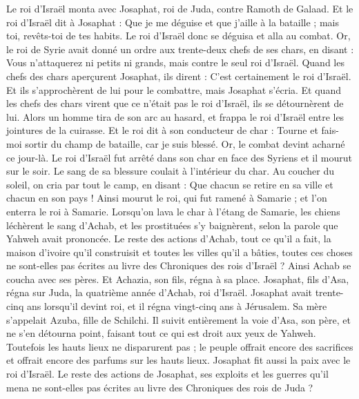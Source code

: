 \begin{multicols}{2}
Le roi d'Israël monta avec Josaphat, roi de Juda, contre Ramoth de Galaad.
Et le roi d'Israël dit à Josaphat : Que je me déguise et que j'aille à la bataille ; mais toi, revêts-toi de tes habits. Le roi d'Israël donc se déguisa et alla au combat.
Or, le roi de Syrie avait donné un ordre aux trente-deux chefs de ses chars, en disant : Vous n’attaquerez ni petits ni grands, mais contre le seul roi d'Israël.
Quand les chefs des chars aperçurent Josaphat, ils dirent : C'est certainement le roi d'Israël. Et ils s’approchèrent de lui pour le combattre, mais Josaphat s'écria.
Et quand les chefs des chars virent que ce n'était pas le roi d'Israël, ils se détournèrent de lui.
Alors un homme tira de son arc au hasard, et frappa le roi d'Israël entre les jointures de la cuirasse. Et le roi dit à son conducteur de char : Tourne et fais-moi sortir du champ de bataille, car je suis blessé.
Or, le combat devint acharné ce jour-là. Le roi d'Israël fut arrêté dans son char en face des Syriens et il mourut sur le soir. Le sang de sa blessure coulait à l’intérieur du char.
Au coucher du soleil, on cria par tout le camp, en disant : Que chacun se retire en sa ville et chacun en son pays !
Ainsi mourut le roi, qui fut ramené à Samarie ; et l’on enterra le roi à Samarie.
Lorsqu’on lava le char à l’étang de Samarie, les chiens léchèrent le sang d’Achab, et les prostituées s’y baignèrent, selon la parole que Yahweh avait prononcée.
Le reste des actions d'Achab, tout ce qu’il a fait, la maison d'ivoire qu'il construisit et toutes les villes qu'il a bâties, toutes ces choses ne sont-elles pas écrites au livre des Chroniques des rois d'Israël ?
Ainsi Achab se coucha avec ses pères. Et Achazia, son fils, régna à sa place.
Josaphat, fils d'Asa, régna sur Juda, la quatrième année d'Achab, roi d'Israël.
Josaphat avait trente-cinq ans lorsqu’il devint roi, et il régna vingt-cinq ans à Jérusalem. Sa mère s’appelait Azuba, fille de Schilchi.
Il suivit entièrement la voie d'Asa, son père, et ne s'en détourna point, faisant tout ce qui est droit aux yeux de Yahweh.
Toutefois les hauts lieux ne disparurent pas ; le peuple offrait encore des sacrifices et offrait encore des parfums sur les hauts lieux.
Josaphat fit aussi la paix avec le roi d'Israël.
Le reste des actions de Josaphat, ses exploits et les guerres qu'il mena ne sont-elles pas écrites au livre des Chroniques des rois de Juda ?

\end{multicols}
